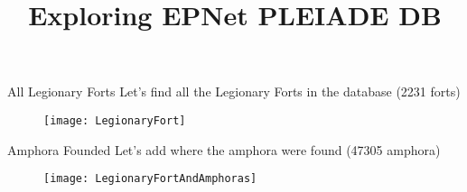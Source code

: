 \documentclass{beamer}
\title{Exploring EPNet PLEIADE DB}
\begin{document}
\begin{frame}{All Legionary Forts}
	Let's find all the Legionary Forts in the database (2231 forts)
	\begin{figure}[htp]
		\begin{center}
			\texttt{[image: LegionaryFort]}
		\end{center}
	\end{figure}
\end{frame}
\begin{frame}{Amphora Founded}
	Let's add where the amphora were found (47305 amphora)
	\begin{figure}[htp]
		\begin{center}
			\texttt{[image: LegionaryFortAndAmphoras]}
		\end{center}
	\end{figure}
\end{frame}
\end{document}
